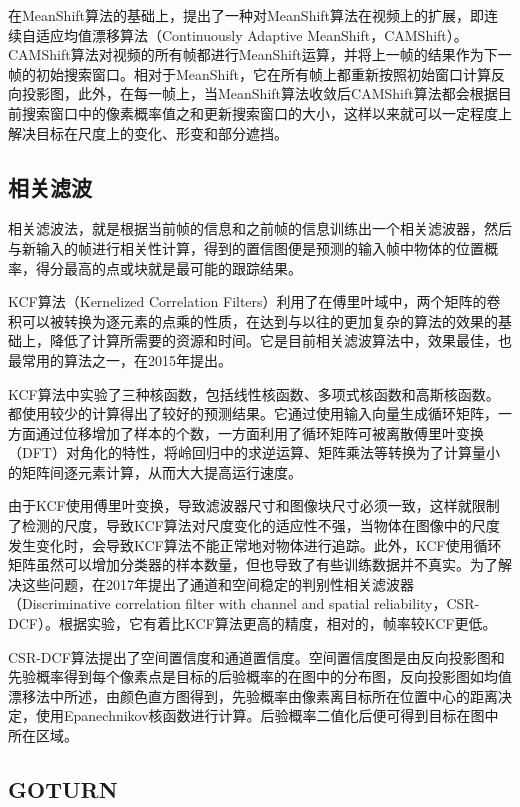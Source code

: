   在MeanShift算法的基础上，\citet{bradski1998computer}提出了一种对MeanShift算法在视频上的扩展，即连续自适应均值漂移算法（Continuously Adaptive MeanShift，CAMShift）。CAMShift算法对视频的所有帧都进行MeanShift运算，并将上一帧的结果作为下一帧的初始搜索窗口。相对于MeanShift，它在所有帧上都重新按照初始窗口计算反向投影图，此外，在每一帧上，当MeanShift算法收敛后CAMShift算法都会根据目前搜索窗口中的像素概率值之和更新搜索窗口的大小，这样以来就可以一定程度上解决目标在尺度上的变化、形变和部分遮挡。

\subsection{相关滤波}

  相关滤波法，就是根据当前帧的信息和之前帧的信息训练出一个相关滤波器，然后与新输入的帧进行相关性计算，得到的置信图便是预测的输入帧中物体的位置概率，得分最高的点或块就是最可能的跟踪结果。

  KCF算法（Kernelized Correlation Filters）利用了在傅里叶域中，两个矩阵的卷积可以被转换为逐元素的点乘的性质，在达到与以往的更加复杂的算法的效果的基础上，降低了计算所需要的资源和时间。它是目前相关滤波算法中，效果最佳，也最常用的算法之一，\citet{henriques2015high}在2015年提出。

  KCF算法中实验了三种核函数，包括线性核函数、多项式核函数和高斯核函数。都使用较少的计算得出了较好的预测结果。它通过使用输入向量生成循环矩阵，一方面通过位移增加了样本的个数，一方面利用了循环矩阵可被离散傅里叶变换（DFT）对角化的特性，将岭回归中的求逆运算、矩阵乘法等转换为了计算量小的矩阵间逐元素计算，从而大大提高运行速度。

  由于KCF使用傅里叶变换，导致滤波器尺寸和图像块尺寸必须一致，这样就限制了检测的尺度，导致KCF算法对尺度变化的适应性不强，当物体在图像中的尺度发生变化时，会导致KCF算法不能正常地对物体进行追踪。此外，KCF使用循环矩阵虽然可以增加分类器的样本数量，但也导致了有些训练数据并不真实。为了解决这些问题，\citet{lukezic2017discriminative}在2017年提出了通道和空间稳定的判别性相关滤波器（Discriminative correlation filter with channel and spatial reliability，CSR-DCF）。根据实验，它有着比KCF算法更高的精度，相对的，帧率较KCF更低。

  CSR-DCF算法提出了空间置信度和通道置信度。空间置信度图是由反向投影图和先验概率得到每个像素点是目标的后验概率的在图中的分布图，反向投影图如均值漂移法中所述，由颜色直方图得到，先验概率由像素离目标所在位置中心的距离决定，使用Epanechnikov核函数进行计算。后验概率二值化后便可得到目标在图中所在区域。

\subsection{GOTURN}

